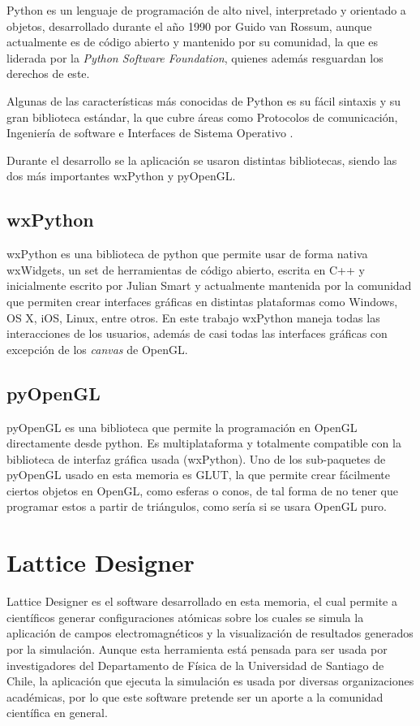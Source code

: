 Python es un lenguaje de programación de alto nivel, interpretado y orientado a objetos, desarrollado durante el año 1990 por Guido van Rossum, aunque actualmente es de código abierto y mantenido por su comunidad, la que es liderada por la \emph{Python Software Foundation}, quienes además resguardan los derechos de este.

Algunas de las características más conocidas de Python es su fácil sintaxis y su gran biblioteca estándar, la que cubre áreas como Protocolos de comunicación, Ingeniería de software e Interfaces de Sistema Operativo \citep{pythonFeatures}.

Durante el desarrollo se la aplicación se usaron distintas bibliotecas, siendo las dos más importantes wxPython y pyOpenGL.

\subsection{wxPython}

wxPython es una biblioteca de python que permite usar de forma nativa wxWidgets, un set de herramientas de código abierto, escrita en C++ y inicialmente escrito por Julian Smart y actualmente mantenida por la comunidad que permiten crear interfaces gráficas en distintas plataformas como Windows, OS X, iOS, Linux, entre otros. En este trabajo wxPython maneja todas las interacciones de los usuarios, además de casi todas las interfaces gráficas con excepción de los \emph{canvas} de OpenGL.

\subsection{pyOpenGL}

pyOpenGL es una biblioteca que permite la programación en OpenGL directamente desde python. Es multiplataforma y totalmente compatible con la biblioteca de interfaz gráfica usada (wxPython). Uno de los sub-paquetes de pyOpenGL usado en esta memoria es GLUT, la que permite crear fácilmente ciertos objetos en OpenGL, como esferas o conos, de tal forma de no tener que programar estos a partir de triángulos, como sería si se usara OpenGL puro.

\section{Lattice Designer}

Lattice Designer es el software desarrollado en esta memoria, el cual permite a científicos generar configuraciones atómicas sobre los cuales se simula la aplicación de campos electromagnéticos y la visualización de resultados generados por la simulación. Aunque esta herramienta está pensada para ser usada por investigadores del Departamento de Física de la Universidad de Santiago de Chile, la aplicación que ejecuta la simulación es usada por diversas organizaciones académicas, por lo que este software pretende ser un aporte a la comunidad científica en general.

